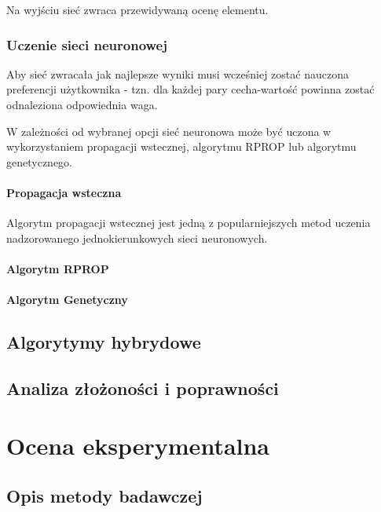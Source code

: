\documentclass[twoside]{iisthesis}
\begin{document}
		 Na wyjściu sieć zwraca przewidywaną ocenę elementu.
		 
		 \subsection{Uczenie sieci neuronowej}
		 
		 Aby sieć zwracała jak najlepsze wyniki musi wcześniej zostać nauczona preferencji użytkownika - tzn. dla każdej pary cecha-wartość powinna zostać odnaleziona odpowiednia waga. 
		 
		 W zależności od wybranej opcji sieć neuronowa może być uczona w wykorzystaniem propagacji wstecznej, algorytmu RPROP lub algorytmu genetycznego. 
		 
		 \subsubsection{Propagacja wsteczna}
		 
			 Algorytm propagacji wstecznej jest jedną z popularniejszych metod uczenia nadzorowanego jednokierunkowych sieci neuronowych. 
		 
 		 \subsubsection{Algorytm RPROP}
		 		 
 		 \subsubsection{Algorytm Genetyczny}	
		 
	 \section{Algorytymy hybrydowe}
	 
	 
	 \section{Analiza złożoności i poprawności}
 
 
\chapter{Ocena eksperymentalna}
	\section{Opis metody badawczej}
	
\end{document}
